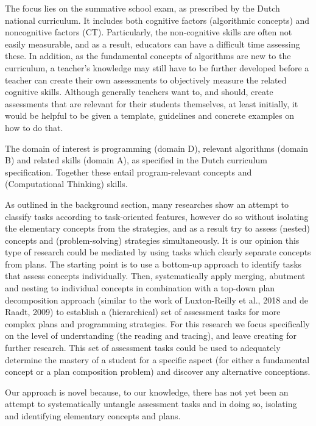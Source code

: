 The focus lies on the summative school exam, as prescribed by the Dutch national curriculum. It includes both cognitive factors (algorithmic concepts) and noncognitive factors (CT).  Particularly, the non-cognitive skills are often not easily measurable, and as a result, educators can have a difficult time assessing these. In addition, as the fundamental concepts of algorithms are new to the curriculum, a teacher’s knowledge may still have to be further developed before a teacher can create their own assessments to objectively measure the related cognitive skills. Although generally teachers want to, and should, create assessments that are relevant for their students themselves, at least initially, it would be helpful to be given a template, guidelines and concrete examples on how to do that.


The domain of interest is programming (domain D), relevant algorithms (domain B) and related skills (domain A), as specified in the Dutch curriculum specification. Together these entail program-relevant concepts and (Computational Thinking) skills.


As outlined in the background section, many researches show an attempt to classify tasks according to task-oriented features, however do so without isolating the elementary concepts from the strategies, and as a result try to assess (nested) concepts and (problem-solving) strategies simultaneously. It is our opinion this type of research could be mediated by using tasks which clearly separate concepts from plans. The starting point is to use a bottom-up approach to identify tasks that assess concepts individually. Then, systematically apply merging, abutment and nesting to individual concepts in combination with a top-down plan decomposition approach (similar to the work of Luxton-Reilly et al., 2018 and de Raadt, 2009) to establish a (hierarchical) set of assessment tasks for more complex plans and programming strategies. For this research we focus specifically on the level of understanding (the reading and tracing), and leave creating for further research. This set of assessment tasks could be used to adequately determine the mastery of a student for a specific aspect (for either a fundamental concept or a plan composition problem) and discover any alternative conceptions.

Our approach is novel because, to our knowledge, there has not yet been an attempt to systematically untangle assessment tasks and in doing so, isolating and identifying elementary concepts and plans.



